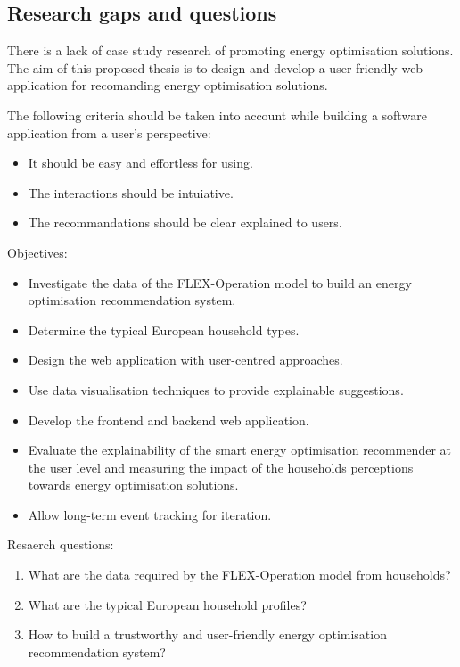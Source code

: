\subsection{Research gaps and questions}

There is a lack of case study research of promoting energy optimisation solutions. 
The aim of this proposed thesis is to design and develop a user-friendly web application for recomanding energy optimisation solutions.

The following criteria should be taken into account while building a software application from a user's perspective: 

\begin{itemize}
  \item It should be easy and effortless for using. 
  \item The interactions should be intuiative. 
  \item The recommandations should be clear explained to users. 
\end{itemize}

Objectives: 

\begin{itemize}
  \item Investigate the data of the FLEX-Operation model to build an energy optimisation recommendation system. 
  \item Determine the typical European household types. 
  \item Design the web application with user-centred approaches. 
  \item Use data visualisation techniques to provide explainable suggestions. 
  \item Develop the frontend and backend web application. 
  \item Evaluate the explainability of the smart energy optimisation recommender at the user level and measuring the impact of the households perceptions towards energy optimisation solutions. 
  \item Allow long-term event tracking for iteration. 
\end{itemize}

Resaerch questions:

\begin{enumerate}
  \item What are the data required by the FLEX-Operation model from households? 
  \item What are the typical European household profiles? 
  \item How to build a trustworthy and user-friendly energy optimisation recommendation system? 
\end{enumerate}

